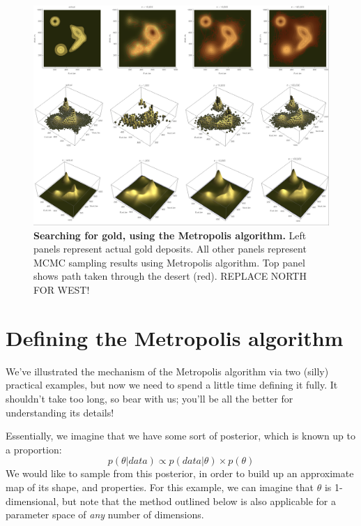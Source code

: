 \documentclass[11pt,fullpage]{book}
\begin{document}
\begin{figure}
\centerline{\includegraphics[width=1.5\textwidth]{metropolisHastings_miningGoldMetropolis.png}}
\caption{\textbf{Searching for gold, using the Metropolis algorithm.} Left panels represent actual gold deposits. All other panels represent MCMC sampling results using Metropolis algorithm. Top panel shows path taken through the desert (red). REPLACE NORTH FOR WEST!}\label{fig:metropolisHastings_miningGoldMetropolis}
\end{figure}

\section{Defining the Metropolis algorithm}\label{sec:metropolisHastings_definingMetropolis}
We've illustrated the mechanism of the Metropolis algorithm via two (silly) practical examples, but now we need to spend a little time defining it fully. It shouldn't take too long, so bear with us; you'll be all the better for understanding its details!

Essentially, we imagine that we have some sort of posterior, which is known up to a proportion:
%
\begin{equation}
p(\theta|data) \propto p(data|\theta) \times p(\theta)
\end{equation}
%
We would like to sample from this posterior, in order to build up an approximate map of its shape, and properties. For this example, we can imagine that $\theta$ is 1-dimensional, but note that the method outlined below is also applicable for a parameter space of \textit{any} number of dimensions.
\end{document}
